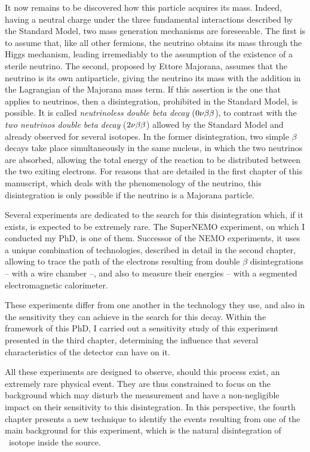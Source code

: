 It now remains to be discovered how this particle acquires its mass.
Indeed, having a neutral charge under the three fundamental interactions described by the Standard Model, two mass generation mechanisms are foreseeable.
The first is to assume that, like all other fermions, the neutrino obtains its mass through the Higgs mechanism, leading irremediably to the assumption of the existence of a sterile neutrino.
The second, proposed by Ettore Majorana, assumes that the neutrino is its own antiparticle, giving the neutrino its mass with the addition in the Lagrangian of the Majorana mass term.
If this assertion is the one that applies to neutrinos, then a disintegration, prohibited in the Standard Model, is possible.
It is called \emph{neutrinoless double beta decay} ($0\nu\beta\beta$), to contrast with the \emph{two neutrinos double beta decay} ($2\nu\beta\beta$) allowed by the Standard Model and already observed for several isotopes.
In the former disintegration, two simple $\beta$ decays take place simultaneously in the same nucleus, in which the two neutrinos are absorbed, allowing the total energy of the reaction to be distributed between the two exiting electrons.
For reasons that are detailed in the first chapter of this manuscript, which deals with the phenomenology of the neutrino, this disintegration is only possible if the neutrino is a Majorana particle.

Several experiments are dedicated to the search for this disintegration which, if it exists, is expected to be extremely rare.
The SuperNEMO experiment, on which I conducted my PhD, is one of them.
Successor of the NEMO experiments, it uses a unique combination of technologies, described in detail in the second chapter, allowing to trace the path of the electrons resulting from double $\beta$ disintegrations -- with a wire chamber --, and also to measure their energies -- with a segmented electromagnetic calorimeter.

These experiments differ from one another in the technology they use, and also in the sensitivity they can achieve in the search for this decay.
Within the framework of this PhD, I carried out a sensitivity study of this experiment presented in the third chapter, determining the influence that several characteristics of the detector can have on it.

All these experiments are designed to observe, should this process exist, an extremely rare physical event.
They are thus constrained to focus on the background which may disturb the measurement and have a non-negligible impact on their sensitivity to this disintegration.
In this perspective, the fourth chapter presents a new technique to identify the events resulting from one of the main background for this experiment, which is the natural disintegration of \Tl\ isotope inside the source.

